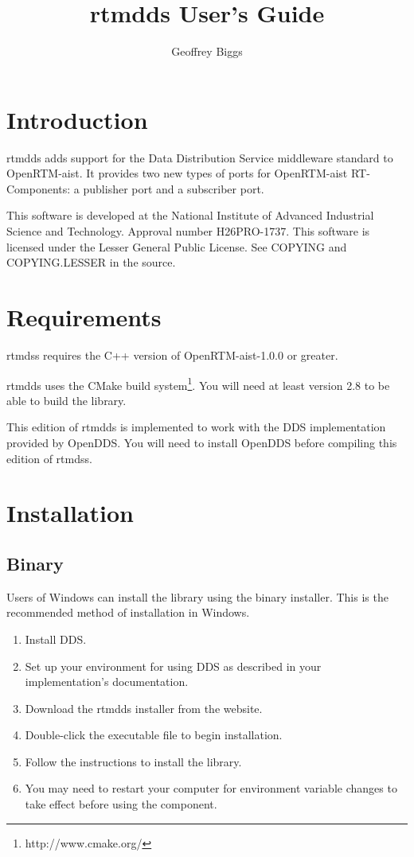 \documentclass[a4paper,10pt]{article}
\title{rtmdds User's Guide}
\author{Geoffrey Biggs}
\begin{document}
\maketitle

\section{Introduction}
\label{sec:intro}

rtmdds adds support for the Data Distribution Service middleware
standard to OpenRTM-aist. It provides two new types of ports for
OpenRTM-aist RT-Components: a publisher port and a subscriber port.

This software is developed at the National Institute of Advanced Industrial
Science and Technology. Approval number H26PRO-1737. This software is licensed
under the Lesser General Public License. See COPYING and COPYING.LESSER in the
source.

\section{Requirements}
\label{sec:requirements}

rtmdss requires the C++ version of OpenRTM-aist-1.0.0 or greater.

rtmdds uses the CMake build system\footnote{http://www.cmake.org/}. You
will need at least version 2.8 to be able to build the library.

This edition of rtmdds is implemented to work with the DDS implementation
provided by OpenDDS. You will need to install OpenDDS before compiling this
edition of rtmdss.

\section{Installation}
\label{sec:installation}

\subsection{Binary}

Users of Windows can install the library using the binary installer.
This is the recommended method of installation in Windows.

\begin{enumerate}
  \item Install DDS.
  \item Set up your environment for using DDS as described in your
  implementation's documentation.
  \item Download the rtmdds installer from the website.
  \item Double-click the executable file to begin installation.
  \item Follow the instructions to install the library.
  \item You may need to restart your computer for environment variable
  changes to take effect before using the component.
\end{enumerate}
\end{document}
